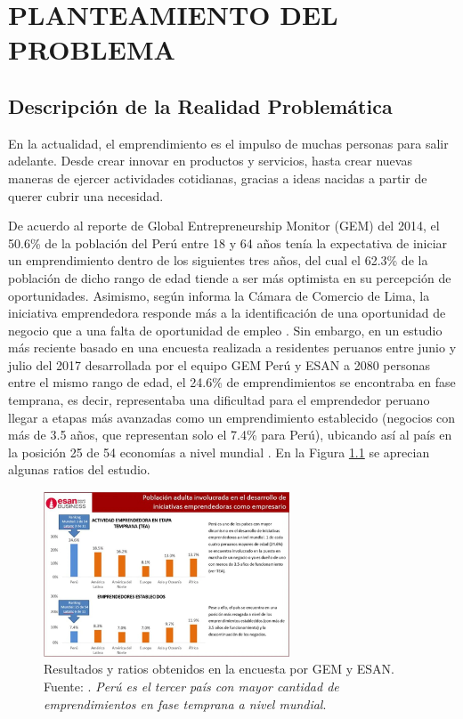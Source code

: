 \chapter{PLANTEAMIENTO DEL PROBLEMA}
\section{Descripción de la Realidad Problemática}

En la actualidad, el emprendimiento es el impulso de muchas personas para salir adelante. Desde crear innovar en productos y servicios, hasta crear nuevas maneras de ejercer actividades cotidianas, gracias a ideas nacidas a partir de querer cubrir una necesidad.

De acuerdo al reporte de Global Entrepreneurship Monitor (GEM) del 2014, el 50.6\% de la población del Perú entre 18 y 64 años tenía la expectativa de iniciar un emprendimiento dentro de los siguientes tres años, del cual el 62.3\% de la población de dicho rango de edad tiende a ser más optimista en su percepción de oportunidades. Asimismo, según informa la Cámara de Comercio de Lima, la iniciativa emprendedora responde más a la identificación de una oportunidad de negocio que a una falta de oportunidad de empleo \parencite{cr_gestion2015emprendper}. Sin embargo, en un estudio más reciente basado en una encuesta realizada a residentes peruanos entre junio y julio del 2017 desarrollada por el equipo GEM Perú y ESAN a 2080 personas entre el mismo rango de edad, el 24.6\% de emprendimientos se encontraba en fase temprana, es decir, representaba una dificultad para el emprendedor peruano llegar a etapas más avanzadas como un emprendimiento establecido (negocios con más de 3.5 años, que representan solo el 7.4\% para Perú), ubicando así al país en la posición 25 de 54 economías a nivel mundial \parencite{cr_gestion2018emprend}. En la Figura \ref{1:fig} se aprecian algunas ratios del estudio. %

\begin{figure}[h]
	\begin{center}
		\includegraphics[width=0.65\textwidth]{1/figures/cuadro_esan.jpg}
		\caption[Resultados y ratios obtenidos en la encuesta por GEM y ESAN]{Resultados y ratios obtenidos en la encuesta por GEM y ESAN.\\
		Fuente: \cite{cr_gestion2018emprend}. \textit{Perú es el tercer país con mayor cantidad de emprendimientos en fase temprana a nivel mundial}.}
		\label{1:fig}
	\end{center}
\end{figure}

